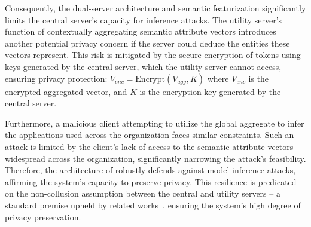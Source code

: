 Consequently, the dual-server architecture and semantic featurization significantly limits the central server's capacity for inference attacks. The utility server's function of contextually aggregating semantic attribute vectors introduces another potential privacy concern if the server could deduce the entities these vectors represent. This risk is mitigated by the secure encryption of tokens using keys generated by the central server, which the utility server cannot access, ensuring privacy protection: \( V_{enc} = \text{Encrypt}(V_{agg}, K) \) where \(V_{enc}\) is the encrypted aggregated vector, and \(K\) is the encryption key generated by the central server.

Furthermore, a malicious client attempting to utilize the global aggregate to infer the applications used across the organization faces similar constraints. Such an attack is limited by the client's lack of access to the semantic attribute vectors widespread across the organization, significantly narrowing the attack's feasibility. Therefore, the architecture of \Sys robustly defends against model inference attacks, affirming the system's capacity to preserve privacy. This resilience is predicated on the non-collusion assumption between the central and utility servers -- a standard premise upheld by related works~\cite{roy2020crypte,wu2022federated}, ensuring the system's high degree of privacy preservation.